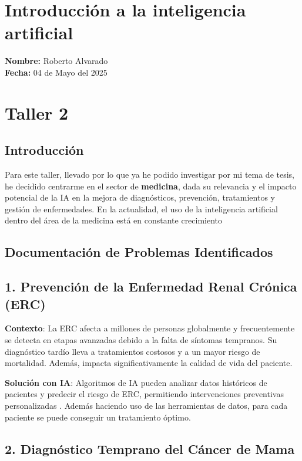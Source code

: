 \documentclass{article}
\author{Roberto Alvarado}
\date{18 de mayo del 2025}
\begin{document}
\section*{\center Introducción a la inteligencia artificial}
\textbf{Nombre:} Roberto Alvarado\\
\textbf{Fecha:} 04 de Mayo del 2025
\section*{Taller 2}

\subsection*{Introducción}
Para este taller, llevado por lo que ya he podido investigar por mi tema de tesis,
he decidido centrarme en el sector de \textbf{medicina}, dada su
relevancia y el impacto potencial de la IA en la mejora de diagnósticos, prevención,
tratamientos y gestión de enfermedades. En la actualidad, el uso de la inteligencia
artificial dentro del área de la medicina está en constante crecimiento

\subsection*{Documentación de Problemas Identificados}

\subsection*{1. Prevención de la Enfermedad Renal Crónica (ERC)}

\textbf{Contexto}: La ERC afecta a millones de personas globalmente y
frecuentemente se detecta en etapas avanzadas debido a la falta de síntomas
tempranos. Su diagnóstico tardío lleva a tratamientos costosos y a
un mayor riesgo de mortalidad. Además, impacta significativamente la calidad de
vida del paciente.\autocite{Revo2023}

\textbf{Solución con IA}: Algoritmos de IA pueden analizar datos históricos de
pacientes y predecir el riesgo de ERC, permitiendo intervenciones preventivas
personalizadas \autocite{fresenius_ai_ckd}. Además haciendo uso de las herramientas
de datos, para cada paciente se puede conseguir un tratamiento óptimo.

\subsection*{2. Diagnóstico Temprano del Cáncer de Mama}
\end{document}
